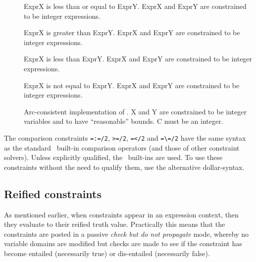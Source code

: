\begin{description}
\item []
ExprX is less than or equal to ExprY.  ExprX and ExprY are constrained to be
integer expressions.

\item []
ExprX is greater than ExprY.  ExprX and ExprY are constrained to be integer
expressions.

\item []
ExprX is less than ExprY.  ExprX and ExprY are constrained to be integer
expressions.

\item []
ExprX is not equal to ExprY.  ExprX and ExprY are constrained to be integer
expressions.

\item []
Arc-consistent implementation of .  X and Y are
constrained to be integer variables and to have ``reasonable'' bounds.  C
must be an integer.

\end{description}

The comparison constraints \verb'=:=/2', \verb'>=/2', \verb'=</2' and
\verb'=\=/2' have the same syntax as the standard \eclipse\ built-in
comparison operators (and those of other constraint solvers).
Unless explicitly qualified, the \eclipse\ built-ins are used.
To use these constraints without the need to qualify them, use the
alternative dollar-syntax.
%
%
%


\subsection{Reified constraints}
\label{sec:reified-constraints}
As mentioned earlier, when constraints appear in an expression
context, then they evaluate to their reified truth value.  Practically
this means that the constraints are posted in a passive {\em check but
do not propagate} mode, whereby no variable domains are modified but
checks are made to see if the constraint has become entailed
(necessarily true) or dis-entailed (necessarily false).


